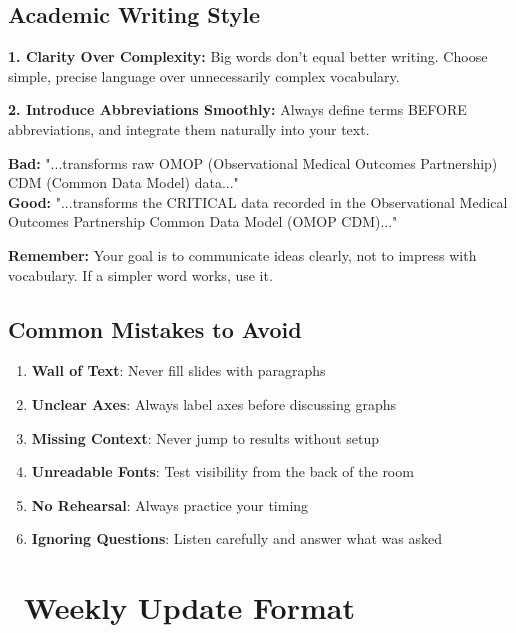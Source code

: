 \documentclass[11pt,a4paper]{article}
\begin{document}
\subsection{Academic Writing Style}

\begin{tcolorbox}[colback=yellow!5,colframe=orange!60,title={\faLightbulb~Some Personal Writing Advice }]
\textbf{1. Clarity Over Complexity:} Big words don't equal better writing. Choose simple, precise language over unnecessarily complex vocabulary.

\textbf{2. Introduce Abbreviations Smoothly:} Always define terms BEFORE abbreviations, and integrate them naturally into your text.

\textbf{Bad:} "...transforms raw OMOP (Observational Medical Outcomes Partnership) CDM (Common Data Model) data..."\\
\textbf{Good:} "...transforms the CRITICAL data recorded in the Observational Medical Outcomes Partnership Common Data Model (OMOP CDM)..."

\textbf{Remember:} Your goal is to communicate ideas clearly, not to impress with vocabulary. If a simpler word works, use it.
\end{tcolorbox}

\subsection{Common Mistakes to Avoid}

\begin{tcolorbox}[colback=red!10,colframe=red!50,title=Don't Do This!]
\begin{enumerate}
    \item \textbf{Wall of Text}: Never fill slides with paragraphs
    \item \textbf{Unclear Axes}: Always label axes before discussing graphs
    \item \textbf{Missing Context}: Never jump to results without setup
    \item \textbf{Unreadable Fonts}: Test visibility from the back of the room
    \item \textbf{No Rehearsal}: Always practice your timing
    \item \textbf{Ignoring Questions}: Listen carefully and answer what was asked
\end{enumerate}
\end{tcolorbox}


\section{\faCalendarCheck~Weekly Update Format}
\end{document}
